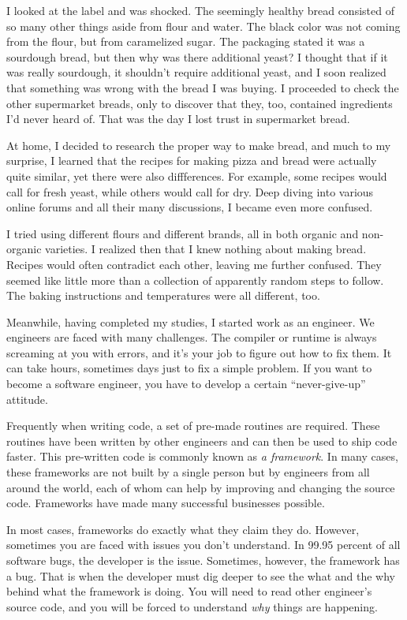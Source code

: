 I looked at the label and was shocked. The seemingly
healthy bread consisted of so many other things aside from flour and water.
The black color was not coming from the flour, but from caramelized sugar.
The packaging stated it was a sourdough bread, but then why was there additional yeast?
I thought that if it was really sourdough, it shouldn't require additional yeast, and I
soon realized that something was wrong with the bread I was buying.
I proceeded to check the other supermarket breads, only to discover that they, too,
contained ingredients I'd never heard of. That was the day I lost trust
in supermarket bread.

At home, I decided to research the proper way to make bread, and much to my surprise,
I learned that the recipes for making pizza and bread were actually quite similar, yet
there were also diffferences. For example, some recipes would call for fresh yeast, while
others would call for dry. Deep diving into various online forums and all their many
discussions, I became even more confused.

I tried using different flours and different brands, all in both organic and non-organic varieties.
I realized then that I knew nothing about making bread. Recipes would often contradict each other,
leaving me further confused. They seemed like little more than a collection of apparently random
steps to follow. The baking instructions and temperatures were all different, too.

Meanwhile, having completed my studies, I started work as an engineer.
We engineers are faced with many challenges. The compiler or runtime is
always screaming at you with errors, and it's your job to figure out how to fix them.
It can take hours, sometimes days just to fix a simple problem. If you want
to become a software engineer, you have to develop a certain ``never-give-up'' attitude.

Frequently when writing code, a set of pre-made routines are required. These routines have been
written by other engineers and can then be used to ship code faster.
This pre-written code is commonly known as {\it a framework}. In many cases,
these frameworks are not built by a single person but by engineers from all around the world,
each of whom can help by improving and changing the source code. Frameworks have made many successful
businesses possible.

In most cases, frameworks do exactly what they claim they do. However,
sometimes you are faced with issues you don't understand. In 99.95 percent
of all software bugs, the developer is the issue. Sometimes, however, the framework has a
bug. That is when the developer must dig deeper to see the what and the why behind what the
framework is doing. You will need to read other engineer's source code, and you will be forced
to understand {\it why} things are happening.

